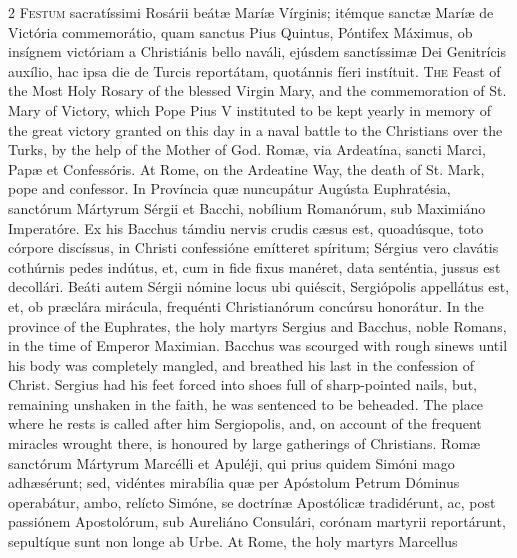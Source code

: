 \begin{paracol}{2}
\lettrine[lines=2]{F}{estum} sacratíssimi 
 Rosárii beátæ Maríæ Vírginis; itémque sanctæ Maríæ de Victória commemorátio, 
 quam sanctus Pius Quintus, Póntifex Máximus, ob insígnem victóriam a 
 Christiánis bello naváli, ejúsdem sanctíssimæ Dei Genitrícis auxílio, hac 
 ipsa die de Turcis reportátam, quotánnis fíeri instítuit.
\switchcolumn
{}
\lettrine[lines=2]{T}{he} Feast of the Most Holy Rosary of 
 the blessed Virgin Mary, and the commemoration of St. Mary of Victory, which 
 Pope Pius V instituted to be kept yearly in memory of the great victory 
 granted on this day in a naval battle to the Christians over the Turks, by 
 the help of the Mother of God.
\switchcolumn*
{}
Romæ, via Ardeatína, 
 sancti Marci, Papæ et Confessóris.
\switchcolumn
{}
At Rome, on the Ardeatine Way, the 
 death of St. Mark, pope and confessor.
\switchcolumn*
{}
In Província quæ 
 nuncupátur Augústa Euphratésia, sanctórum Mártyrum Sérgii et Bacchi, 
 nobílium Romanórum, sub Maximiáno Imperatóre. Ex his Bacchus támdiu 
 nervis crudis cæsus est, quoadúsque, toto córpore discíssus, in Christi 
 confessióne emítteret spíritum; Sérgius vero clavátis cothúrnis pedes 
 indútus, et, cum in fide fixus manéret, data senténtia, jussus est decollári. 
 Beáti autem Sérgii nómine locus ubi quiéscit, Sergiópolis appellátus est, 
 et, ob præclára mirácula, frequénti Christianórum concúrsu honorátur.
\switchcolumn
{}
In the province of the Euphrates, 
 the holy martyrs Sergius and Bacchus, noble Romans, in the time of Emperor 
 Maximian. Bacchus was scourged with rough sinews until his body was 
 completely mangled, and breathed his last in the confession of Christ. 
 Sergius had his feet forced into shoes full of sharp-pointed nails, but, 
 remaining unshaken in the faith, he was sentenced to be beheaded. The 
 place where he rests is called after him Sergiopolis, and, on account of the 
 frequent miracles wrought there, is honoured by large gatherings of 
 Christians.
\switchcolumn*
{}
Romæ sanctórum Mártyrum 
 Marcélli et Apuléji, qui prius quidem Simóni mago adhæsérunt; sed, vidéntes 
 mirabília quæ per Apóstolum Petrum Dóminus operabátur, ambo, relícto Simóne, 
 se doctrínæ Apostólicæ tradidérunt, ac, post passiónem Apostolórum, sub 
 Aureliáno Consulári, corónam martyrii reportárunt, sepultíque sunt non longe 
 ab Urbe.
\switchcolumn
{}
At Rome, the holy martyrs Marcellus 

\end{paracol}
